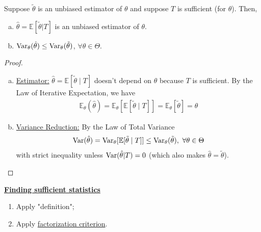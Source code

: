 \documentclass[11pt]{elegantbook}
\begin{document}
\begin{theorem}
    \normalfont
    Suppose $\tilde{\theta}$ is an unbiased estimator of $\theta$ and suppose $T$ is sufficient (for $\theta$). Then,
    \begin{enumerate}[(a).]
        \item $\hat{\theta}=\mathbb{E}[\tilde{\theta}|T]$ is an unbiased estimator of $\theta$.
        \item $\textnormal{Var}_\theta(\hat{\theta})\leq \textnormal{Var}_\theta(\tilde{\theta})$, $\forall \theta\in\Theta$.
    \end{enumerate}
\end{theorem}
\begin{proof}
    \begin{enumerate}[(a).]
        \item \underline{Estimator:} $\hat{\theta}=\mathbb{E}[\tilde{\theta}\mid T]$ doesn't depend on $\theta$ because $T$ is sufficient. By the Law of Iterative Expectation, we have
        \begin{equation}
            \begin{aligned}
                \mathbb{E}_\theta(\hat{\theta})=\mathbb{E}_\theta[\mathbb{E}[\tilde{\theta}\mid T]]=\mathbb{E}_\theta[\tilde{\theta}]=\theta
            \end{aligned}
            \nonumber
        \end{equation}
        \item \underline{Variance Reduction:} By the Law of Total Variance
        \begin{equation}
            \begin{aligned}
                \textnormal{Var}(\hat{\theta})=\textnormal{Var}_\theta[\mathbb{E}[\tilde{\theta}\mid T]]\leq \textnormal{Var}_\theta(\tilde{\theta}),\ \forall \theta\in \Theta
            \end{aligned}
            \nonumber
        \end{equation}
        with strict inequality unless $\textnormal{Var}(\hat{\theta}|T)=0$ (which also makes $\hat{\theta}=\tilde{\theta}$).
    \end{enumerate}
\end{proof}


\textbf{\underline{Finding sufficient statistics}}
\begin{enumerate}[$\circ$]
    \item Apply "definition";
    \item Apply \underline{factorization criterion}.
\end{enumerate}
\end{document}

